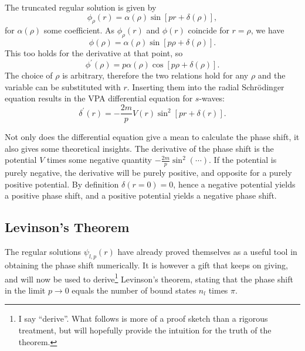 The truncated regular solution is given by
\begin{equation*}
  \phi_{\rho}(r) = \alpha(\rho)\sin\left[pr+\delta(\rho)\right],
\end{equation*}
for \(\alpha(\rho)\) some coefficient. As \(\phi_{\rho}(r)\) and \(\phi(r)\)
coincide for \(r=\rho\), we have
\begin{equation*}
  \phi(\rho) =  \alpha(\rho)\sin\left[p\rho+\delta(\rho)\right].
\end{equation*}
This too holds for the derivative at that point, so
\begin{equation*}
  \phi^{\prime}(\rho) =  p\alpha(\rho)\cos\left[p\rho+\delta(\rho)\right].
\end{equation*}
The choice of \(\rho\) is arbitrary, therefore the two relations hold for any
\(\rho\) and the variable can be substituted with \(r\). Inserting them into the
radial Schr\"odinger equation results in the VPA differential equation for \(s\)-waves:
\begin{equation}
  \label{eq:vpa}
  \delta^{\prime}(r) = -\frac{2m}{p}V(r)\sin^{2}[pr+\delta(r)].
\end{equation}

Not only does the differential equation give a mean to calculate the phase
shift, it also gives some theoretical insights. The derivative of the phase
shift is the potential \(V\) times some negative quantity
\(-\frac{2m}{p}\sin^{2}(\cdots)\). If the potential is purely negative, the
derivative will be purely positive, and opposite for a purely positive
potential. By definition \(\delta(r=0)=0\), hence a negative potential yields a
positive phase shift, and a positive potential yields a negative phase shift.

\subsection{Levinson's Theorem}

The regular solutions \(\psi_{l,p}(r)\) have already proved themselves as a
useful tool in obtaining the phase shift numerically. It is however a gift that
keeps on giving, and will now be used to derive\footnote{I say ``derive''. What
  follows is more of a proof sketch than a rigorous treatment, but will
  hopefully provide the intuition for the truth of the theorem.} Levinson's
theorem, stating that the phase shift in the limit \(p\to 0\) equals the number
of bound states \(n_{l}\) times \(\pi\).


